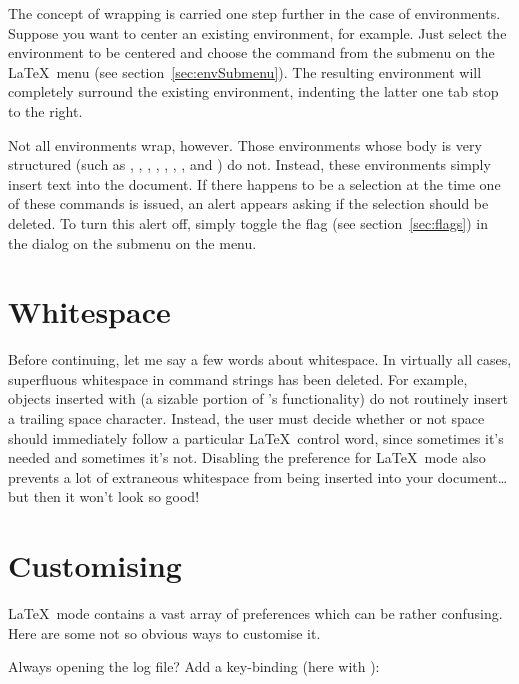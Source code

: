 \documentclass{report}
\begin{document}
The concept of wrapping is carried one step further in the case of 
environments.  Suppose you want to center an existing  
environment, for example.  Just select the  environment 
to be centered and choose the  command from the 
 submenu on the \LaTeX\ menu (see 
section~\ref{sec:envSubmenu}).  The resulting  environment 
will completely surround the existing  environment, 
indenting the latter one tab stop to the right.

Not all environments wrap, however.  Those environments whose body is 
very structured (such as , , 
, , , , 
, and ) do not.  Instead, these 
environments simply insert text into the document.  If there happens 
to be a selection at the time one of these commands is issued, an 
alert appears asking if the selection should be deleted.  To turn this 
alert off, simply toggle the flag  (see 
section~\ref{sec:flags}) in the  dialog on the 
 submenu on the  menu.


\section{Whitespace}

Before continuing, let me say a few words about whitespace.  In 
virtually all cases, superfluous whitespace in command strings has 
been deleted.  For example, objects inserted with  
(a sizable portion of 's functionality) do not 
routinely insert a trailing space character.  Instead, the user must 
decide whether or not space should immediately follow a particular 
\LaTeX\ control word, since sometimes it's needed and sometimes it's 
not.  Disabling the  preference for \LaTeX\ mode also 
prevents a lot of extraneous whitespace from being inserted into your 
document\ldots but then it won't look so good!

\section{Customising}

\LaTeX\ mode contains a vast array of preferences which can be rather 
confusing.  Here are some not so obvious ways to customise it.

Always opening the log file? Add a key-binding (here with 
):
\end{document}

